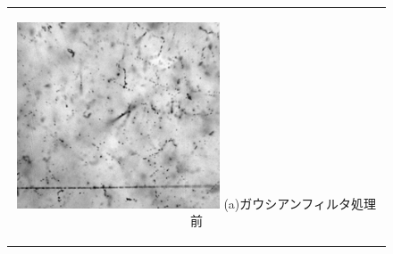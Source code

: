 \documentclass[12pt,a4paper]{jarticle}
\begin{document}
\begin{figure}[htbp]
    \begin{center}
      \begin{tabular}{c}
        \begin{minipage}{0.5\hsize}
          \begin{center}
            \includegraphics[clip, width=60mm]{cont.png}
            \hspace{1.6cm} (a)ガウシアンフィルタ処理前
          \end{center}
        \end{minipage}
        

\end{tabular}
\end{center}
\end{figure}
\end{document}
